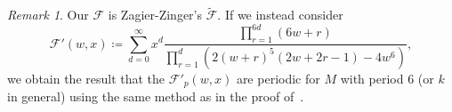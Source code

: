 \documentclass[10pt]{amsart}
\theoremstyle{definition}
\theoremstyle{remark}
\newtheorem{rmk}[thm]{Remark}
\theoremstyle{plain}
\theoremstyle{definition}
\theoremstyle{remark}
\newcommand{\msc}[1]{\mathscr{#1}}
\newcommand{\wt}[1]{\widetilde{#1}}
\newcommand{\1}{\mathbf{1}}
\newcommand{\2}{\mathbf{2}}
\newcommand{\3}{\mathbf{3}}
\numberwithin{equation}{section}
\begin{document}
\begin{rmk}
    Our $\msc{F}$ is Zagier-Zinger's $\wt{\msc{F}}$. If we instead consider 
    \[ \msc{F}'(w,x) \coloneqq \sum_{d=0}^{\infty} x^d \frac{\prod_{r=1}^{6d} (6w+r)}{\prod_{r=1}^d (2(w+r)^5(2w+2r-1) - 4w^6)}, \]
    we obtain the result that the $\msc{F}'_p(w,x)$ are periodic for $M$ with period $6$ (or $k$ in general) using the same method as in the proof of~\cite[Theorem 2]{zagierzinger}.
\end{rmk}

\printbibliography
\end{document}
